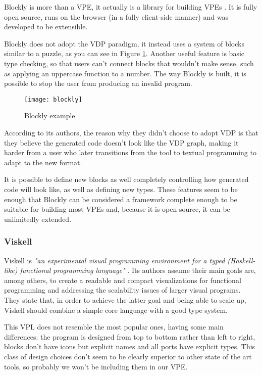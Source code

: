 Blockly is more than a VPE, it actually is a library for building VPEs \cite{blockly}.
It is fully open source, runs on the browser (in a fully client-side manner) and
was developed to be extensible.

Blockly does not adopt the VDP paradigm, it instead uses a system of blocks
similar to a puzzle, as you can see in Figure \ref{fig:blockly}.
Another useful feature is basic type checking,
so that users can't connect blocks that wouldn't make sense, such as applying an
uppercase function to a number. The way Blockly is built, it is possible to stop the user
from producing an invalid program.

\begin{figure}[t]
  \begin{center}
    \leavevmode
    \texttt{[image: blockly]}
    \caption{Blockly example \cite{blockly}}
    \label{fig:blockly}
  \end{center}
\end{figure}

According to its authors, the reason why they didn't choose to adopt VDP is that
they believe the generated code doesn't look like the VDP graph, making it harder
from a user who later transitions from the tool to textual programming to adapt
to the new format.

It is possible to define new blocks as well completely controlling
how generated code will look like, as well as defining new types. These features
seem to be enough that Blockly can be considered a framework complete enough to
be suitable for building most VPEs and, because it is open-source, it can be
unlimitedly extended.

\subsubsection{Viskell}
\label{sec:viskell}

Viskell is \textit{"an experimental visual programming environment for a typed
(Haskell-like) functional programming language"} \cite{viskell}. Its authors
assume their main goals are, among others, to create a readable and compact
visualizations for functional programming and addressing the scalability issues
of larger visual programs. They state that, in order to achieve the latter goal
and being able to scale up, Viskell should combine a simple core language with
a good type system.

This VPL does not resemble the most popular ones, having some main differences:
the program is designed from top to bottom rather than left to right, blocks
don't have icons but explicit names and all ports have explicit types. This class
of design choices don't seem to be clearly superior to other state of the art tools,
so probably we won't be including them in our VPE.

